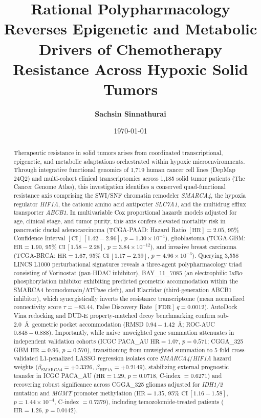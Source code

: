 \documentclass[11pt,a4paper]{article}
\title{\textbf{\Large Rational Polypharmacology Reverses Epigenetic and Metabolic Drivers of Chemotherapy Resistance Across Hypoxic Solid Tumors}}
\author{\textbf{Sachsin Sinnathurai}}
\affil{Department of Anatomy \& Cell Biology, McGill University, Montreal, QC, Canada \\
\texttt{sachsin.sinnathurai@mail.mcgill.ca}}
\date{\today}
\begin{document}
\maketitle
\thispagestyle{fancy}

\begin{abstract}
\noindent Therapeutic resistance in solid tumors arises from coordinated transcriptional, epigenetic, and metabolic adaptations orchestrated within hypoxic microenvironments. Through integrative functional genomics of 1,719 human cancer cell lines (DepMap 24Q2) and multi-cohort clinical transcriptomics across 1,185 solid tumor patients (The Cancer Genome Atlas), this investigation identifies a conserved quad-functional resistance axis comprising the SWI/SNF chromatin remodeler \textit{SMARCA4}, the hypoxia regulator \textit{HIF1A}, the cationic amino acid antiporter \textit{SLC7A1}, and the multidrug efflux transporter \textit{ABCB1}. In multivariable Cox proportional hazards models adjusted for age, clinical stage, and tumor purity, this axis confers elevated mortality risk in pancreatic ductal adenocarcinoma (TCGA-PAAD: Hazard Ratio $[\text{HR}] = 2.05$, 95\% Confidence Interval $[\text{CI}]~[1.42 - 2.96]$, $p = 1.30 \times 10^{-4}$), glioblastoma (TCGA-GBM: $\text{HR} = 1.90$, 95\% $\text{CI}~[1.58 - 2.28]$, $p = 3.84 \times 10^{-12}$), and invasive breast carcinoma (TCGA-BRCA: $\text{HR} = 1.67$, 95\% $\text{CI}~[1.17 - 2.39]$, $p = 4.96 \times 10^{-3}$). Querying 3,558 LINCS L1000 perturbational signatures reveals a three-agent polypharmacology triad consisting of Vorinostat (pan-HDAC inhibitor), BAY\_11\_7085 (an electrophilic $\text{I}\kappa\text{B}\alpha$ phosphorylation inhibitor exhibiting predicted geometric accommodation within the SMARCA4 bromodomain/ATPase cleft), and Elacridar (third-generation ABCB1 inhibitor), which synergistically inverts the resistance transcriptome (mean normalized connectivity score $\tau = -83.44$, False Discovery Rate $[\text{FDR}]~q = 0.0012$). AutoDock Vina redocking and DUD-E property-matched decoy benchmarking confirm sub-2.0~\AA\ geometric pocket accommodation (RMSD $0.94 - 1.42$~\AA; ROC-AUC $0.848 - 0.888$). Importantly, while naive unweighted gene summation attenuates in independent validation cohorts (ICGC PACA\_AU $\text{HR} = 1.07$, $p = 0.571$; CGGA\_325 GBM $\text{HR} = 0.96$, $p = 0.570$), transitioning from unweighted summation to 5-fold cross-validated L1-penalized LASSO regression isolates core \textit{SMARCA4}/\textit{HIF1A} hazard weights ($\beta_{\text{SMARCA4}} = +0.3326$, $\beta_{\text{HIF1A}} = +0.2149$), stabilizing external prognostic transfer in ICGC PACA\_AU ($\text{HR} = 1.29$, $p = 0.0718$, C-index $= 0.6271$) and recovering robust significance across CGGA\_325 gliomas adjusted for \textit{IDH1/2} mutation and \textit{MGMT} promoter methylation ($\text{HR} = 1.35$, 95\% $\text{CI}~[1.16 - 1.58]$, $p = 1.44 \times 10^{-4}$, C-index $= 0.7379$), including temozolomide-treated patients ($\text{HR} = 1.26$, $p = 0.0142$).
\end{abstract}
\end{document}

